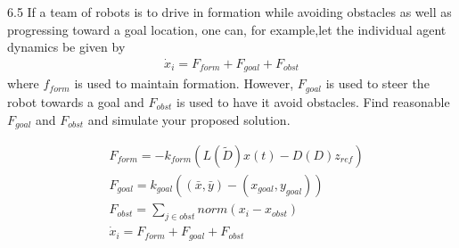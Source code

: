 \documentclass{article}
\begin{document}
\begin{problem}6.5
    If a team of robots is to drive in formation while avoiding obstacles as well as progressing toward a goal location, one can, for example,let the individual agent dynamics be given by
    \begin{align*}
        \dot x_i = F_{form} + F_{goal} + F_{obst}
    \end{align*}
    where $f_{form}$ is used to maintain formation. However, $F_{goal}$ is used to steer the robot towards a goal and $F_{obst}$ is used to have it avoid obstacles. Find reasonable $F_{goal}$ and $F_{obst}$ and simulate your proposed solution. 
    
    
    \begin{align*}
        &F_{form} = -k_{form}(L(\widetilde{D})x(t) - D(D)z_{ref})\\
        &F_{goal} = k_{goal}((\bar x, \bar y) - (x_{goal}, y_{goal}))\\
        &F_{obst} = \sum_{j \in obst} norm(x_i - x_{obst})\\
        &\dot x_i = F_{form} + F_{goal} + F_{obst}
    \end{align*}

    
\end{problem}
\newpage
\end{document}
